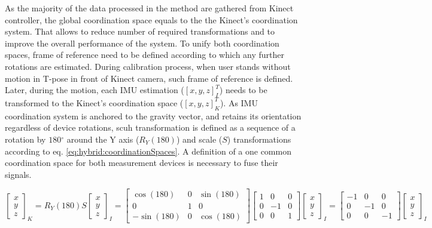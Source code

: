 \documentclass[sensors,article,submit,moreauthors,pdftex,10pt,a4paper]{mdpi}
\newcommand{\degree}{\ensuremath{{}^{\circ}}\xspace}
\begin{document}
	
As the majority of the data processed in the method are gathered from Kinect controller, the global coordination space equals to the the Kinect's coordination system. That allows to reduce number of required transformations and to improve the overall performance of the system. 
To unify both coordination spaces, frame of reference need to be defined according to which any further rotations are estimated. During calibration process, when user stands without motion in T-pose in front of Kinect camera, such frame of reference is defined. Later, during the motion, each IMU estimation ($[x,y,z]_I^T$) needs to be transformed to the Kinect's coordination space ($[x, y, z]_K^T$). As IMU coordination system is anchored to the gravity vector, and retains its orientation regardless of device rotations, scuh transformation is defined as a sequence of a rotation by $180\degree$ around the Y axis ($R_Y(180)$) and scale ($S$) transformations according to eq. \ref{eq:hybrid:coordinationSpaces}. A definition of a one common coordination space for both measurement devices is necessary to fuse their signals.

\begin{equation}
	\begin{bmatrix}
		x \\ y \\ z	
	\end{bmatrix}_K
	= R_Y(180) S \begin{bmatrix}
	x \\ y \\ z	
	\end{bmatrix}_I 	= 
	\begin{bmatrix}
		\cos(180)  & 0 & \sin(180) \\ 
		0          & 1 & 0         \\ 
		-\sin(180) & 0 & \cos(180) 
	\end{bmatrix} 	
	\begin{bmatrix}
		1 & 0  & 0 \\ 
		0 & -1 & 0 \\ 
		0 & 0  & 1 
	\end{bmatrix} 	
	\begin{bmatrix}
		x \\ y \\ z	
	\end{bmatrix}_I	= 	
	\begin{bmatrix}
		-1 & 0  & 0  \\ 
		0  & -1 & 0  \\ 
		0  & 0  & -1 
	\end{bmatrix} 		
	\begin{bmatrix}
		x \\ y \\ z	
	\end{bmatrix}_I
	\label{eq:hybrid:coordinationSpaces}
\end{equation}
\end{document}
